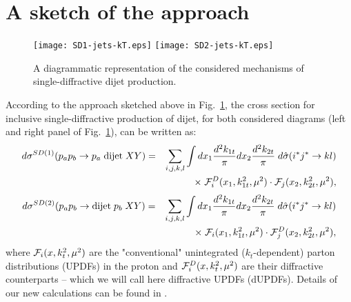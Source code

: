 \documentclass[12pt]{article}
\begin{document}
\section{A sketch of the approach}

\begin{figure}[htb]
\centering
\texttt{[image: SD1-jets-kT.eps]}
\texttt{[image: SD2-jets-kT.eps]}
\caption{A diagrammatic representation of the considered mechanisms of single-diffractive dijet production.}
\label{fig:mechanism}
\end{figure}

According to the approach sketched above in Fig.~\ref{fig:mechanism}, the cross section for inclusive single-diffractive production of dijet, for both considered diagrams (left and right panel of Fig.~\ref{fig:mechanism}), can be written as:
%
\begin{eqnarray}
d \sigma^{SD(1)}({p_{a} p_{b} \to p_{a} \; \mathrm{dijet} \; X Y}) &=& \sum_{i,j,k,l}
\int d x_1 \frac{d^2 k_{1t}}{\pi} d x_2 \frac{d^2 k_{2t}}{\pi} \; d {\hat \sigma}({i^{*}j^{*} \to kl }) \nonumber \\
&& \times \; {\cal F}_{i}^{D}(x_1,k_{1t}^2,\mu^2) \cdot {\cal F}_{j}(x_2,k_{2t}^2,\mu^2) ,
\label{SDA_formula}
\end{eqnarray}
%
%
\begin{eqnarray}
d \sigma^{SD(2)}({p_{a} p_{b} \to \mathrm{dijet} \; p_{b} \; X Y}) &=& \sum_{i,j,k,l}
\int d x_1 \frac{d^2 k_{1t}}{\pi} d x_2 \frac{d^2 k_{2t}}{\pi} \; d {\hat \sigma}({i^{*}j^{*} \to kl }) \nonumber \\
&& \times \; {\cal F}_{i}(x_1,k_{1t}^2,\mu^2) \cdot {\cal F}_{j}^{D}(x_2,k_{2t}^2,\mu^2),
\label{SDB_formula}
\end{eqnarray}
%
where ${\cal F}_{i}(x,k_{t}^2,\mu^2)$ are the "conventional" unintegrated ($k_{t}$-dependent) parton distributions (UPDFs) in the proton and ${\cal F}_{i}^{D}(x,k_{t}^2,\mu^2)$ are their diffractive counterparts -- which we will call here diffractive UPDFs (dUPDFs). Details of our new calculations can be found in \cite{Luszczak:2017pna}.
\end{document}
